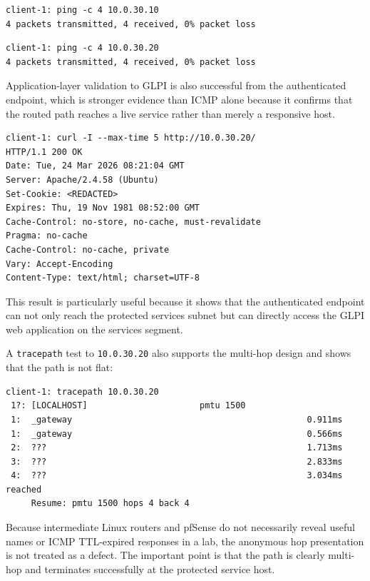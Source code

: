 \documentclass[11pt]{article}
\begin{document}
\begin{verbatim}
client-1: ping -c 4 10.0.30.10
4 packets transmitted, 4 received, 0% packet loss
\end{verbatim}

\begin{verbatim}
client-1: ping -c 4 10.0.30.20
4 packets transmitted, 4 received, 0% packet loss
\end{verbatim}

Application-layer validation to GLPI is also successful from the authenticated endpoint, which is stronger evidence than ICMP alone because it confirms that the routed path reaches a live service rather than merely a responsive host.

\begin{verbatim}
client-1: curl -I --max-time 5 http://10.0.30.20/
HTTP/1.1 200 OK
Date: Tue, 24 Mar 2026 08:21:04 GMT
Server: Apache/2.4.58 (Ubuntu)
Set-Cookie: <REDACTED>
Expires: Thu, 19 Nov 1981 08:52:00 GMT
Cache-Control: no-store, no-cache, must-revalidate
Pragma: no-cache
Cache-Control: no-cache, private
Vary: Accept-Encoding
Content-Type: text/html; charset=UTF-8
\end{verbatim}

This result is particularly useful because it shows that the authenticated endpoint can not only reach the protected services subnet but can directly access the GLPI web application on the services segment.

A \texttt{tracepath} test to \texttt{10.0.30.20} also supports the multi-hop design and shows that the path is not flat:

\begin{verbatim}
client-1: tracepath 10.0.30.20
 1?: [LOCALHOST]                      pmtu 1500
 1:  _gateway                                              0.911ms
 1:  _gateway                                              0.566ms
 2:  ???                                                   1.713ms
 3:  ???                                                   2.833ms
 4:  ???                                                   3.034ms reached
     Resume: pmtu 1500 hops 4 back 4
\end{verbatim}

Because intermediate Linux routers and pfSense do not necessarily reveal useful names or ICMP TTL-expired responses in a lab, the anonymous hop presentation is not treated as a defect. The important point is that the path is clearly multi-hop and terminates successfully at the protected service host.
\end{document}
